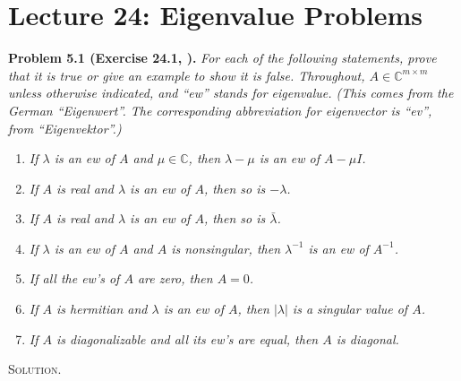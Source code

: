 \documentclass[a4paper,oneside]{book}
\numberwithin{equation}{chapter}
\begin{document}
\section{Lecture 24: Eigenvalue Problems}
\textbf{Problem 5.1 (Exercise 24.1, \cite{1}).} \textit{For each of the following statements, prove that it is true or give an example to show it is false. Throughout, $A \in {\mathbb{C}^{m \times m}}$ unless otherwise indicated, and ``ew'' stands for eigenvalue. (This comes from the German ``Eigenwert''. The corresponding abbreviation for eigenvector is ``ev'', from ``Eigenvektor''.)}
\begin{enumerate}
\item \textit{If $\lambda$ is an ew of $A$ and $\mu \in \mathbb{C}$, then $\lambda -\mu$ is an ew of $A-\mu I$.}
\item \textit{If $A$ is real and $\lambda$ is an ew of $A$, then so is $-\lambda$.}
\item \textit{If $A$ is real and $\lambda$ is an ew of $A$, then so is $\bar{\lambda}$.}
\item \textit{If $\lambda$ is an ew of $A$ and $A$ is nonsingular, then $\lambda ^{-1}$ is an ew of $A^{-1}$.}
\item \textit{If all the ew's of $A$ are zero, then $A=0$.}
\item \textit{If $A$ is hermitian and $\lambda$ is an ew of $A$, then $\left| \lambda  \right|$ is a singular value of $A$.}
\item \textit{If $A$ is diagonalizable and all its ew's are equal, then $A$ is diagonal.}
\end{enumerate}
\textsc{Solution.} 
\end{document}
